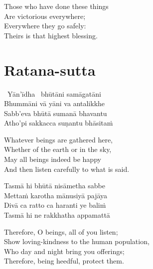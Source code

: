 \begin{english-verses}
  Those who have done these things\\
  Are victorious everywhere;\\
  Everywhere they go safely:\\
  Theirs is that highest blessing.
\end{english-verses}

\suttaRef{[Snp 2.4]}

\section{Ratana-sutta}
\label{ratana-sutta}

\begin{pali-hangtogether}
  \anglebracketleft\ \hspace{-0.5mm}Yān'īdha \hspace{-0.5mm}\anglebracketright\ bhūtāni samāgatāni\\
  Bhummāni vā yāni va antalikkhe\\
  Sabb'eva bhūtā sumanā bhavantu\\
  Atho'pi sakkacca suṇantu bhāsitaṁ
\end{pali-hangtogether}

\begin{english-verses}
  Whatever beings are gathered here,\\
  Whether of the earth or in the sky,\\
  May all beings indeed be happy\\
  And then listen carefully to what is said.
\end{english-verses}

\begin{pali-hang-continued}
  Tasmā hi bhūtā nisāmetha sabbe\\
  Mettaṁ karotha mānusiyā pajāya\\
  Divā ca ratto ca haranti ye baliṁ\\
  Tasmā hi ne rakkhatha appamattā
\end{pali-hang-continued}

\begin{english-verses}
  Therefore, O beings, all of you listen;\\
  Show loving-kindness to the human population,\\
  Who day and night bring you offerings;\\
  Therefore, being heedful, protect them.
\end{english-verses}

